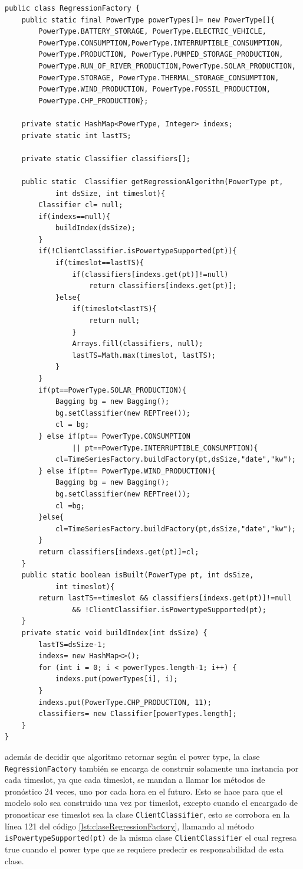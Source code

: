 \begin{lstlisting}[frame=single]  
public class RegressionFactory {
	public static final PowerType powerTypes[]= new PowerType[]{
		PowerType.BATTERY_STORAGE, PowerType.ELECTRIC_VEHICLE,
		PowerType.CONSUMPTION,PowerType.INTERRUPTIBLE_CONSUMPTION, 
		PowerType.PRODUCTION, PowerType.PUMPED_STORAGE_PRODUCTION, 
		PowerType.RUN_OF_RIVER_PRODUCTION,PowerType.SOLAR_PRODUCTION, 
		PowerType.STORAGE, PowerType.THERMAL_STORAGE_CONSUMPTION, 
		PowerType.WIND_PRODUCTION, PowerType.FOSSIL_PRODUCTION, 
		PowerType.CHP_PRODUCTION};
	
	private static HashMap<PowerType, Integer> indexs;
	private static int lastTS;
	
	private static Classifier classifiers[];
	
	public static  Classifier getRegressionAlgorithm(PowerType pt, 
			int dsSize, int timeslot){
		Classifier cl= null;
		if(indexs==null){
			buildIndex(dsSize);
		}
		if(!ClientClassifier.isPowertypeSupported(pt)){
			if(timeslot==lastTS){ 
				if(classifiers[indexs.get(pt)]!=null)
					return classifiers[indexs.get(pt)];
			}else{
				if(timeslot<lastTS){
					return null;
				}
				Arrays.fill(classifiers, null);
				lastTS=Math.max(timeslot, lastTS);
			}
		}
		if(pt==PowerType.SOLAR_PRODUCTION){
			Bagging bg = new Bagging();
	    	bg.setClassifier(new REPTree());
	    	cl = bg;
		} else if(pt== PowerType.CONSUMPTION 
				|| pt==PowerType.INTERRUPTIBLE_CONSUMPTION){
			cl=TimeSeriesFactory.buildFactory(pt,dsSize,"date","kw");
		} else if(pt== PowerType.WIND_PRODUCTION){
			Bagging bg = new Bagging();  
	    	bg.setClassifier(new REPTree());
	    	cl =bg;
		}else{
			cl=TimeSeriesFactory.buildFactory(pt,dsSize,"date","kw");
		}
		return classifiers[indexs.get(pt)]=cl;
	}
	public static boolean isBuilt(PowerType pt, int dsSize, 
			int timeslot){
		return lastTS==timeslot && classifiers[indexs.get(pt)]!=null 
				&& !ClientClassifier.isPowertypeSupported(pt); 
	}
	private static void buildIndex(int dsSize) {
		lastTS=dsSize-1;
		indexs= new HashMap<>();
		for (int i = 0; i < powerTypes.length-1; i++) {
			indexs.put(powerTypes[i], i);
		}
		indexs.put(PowerType.CHP_PRODUCTION, 11);
		classifiers= new Classifier[powerTypes.length];
	}
}	
\end{lstlisting}
además de decidir que algoritmo retornar según el power type, la clase \texttt{RegressionFactory} también se encarga de construir solamente una instancia por cada timeslot, ya que cada timeslot, se mandan a llamar los métodos de pronóstico 24 veces, uno por cada hora en el futuro. Esto se hace para que el modelo solo sea construido una vez por timeslot, excepto cuando el encargado de pronosticar ese timeslot sea la clase \texttt{ClientClassifier}, esto se corrobora en la línea 121 del código \ref{lst:claseRegressionFactory}, llamando al método \texttt{isPowertypeSupported(pt)} de la misma clase \texttt{ClientClassifier} el cual regresa true cuando el power type que se requiere predecir es responsabilidad de esta clase.


